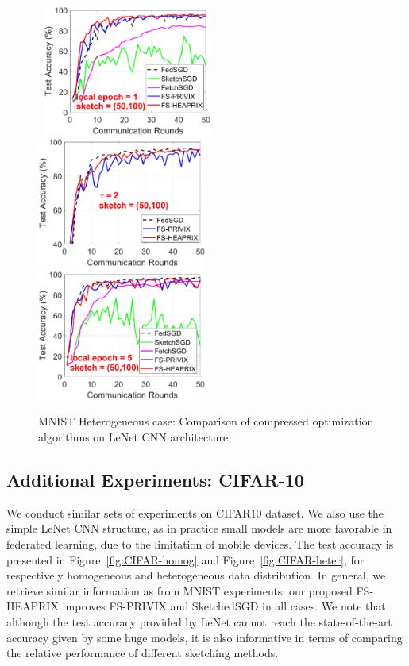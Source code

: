 \documentclass[11pt]{article}
\begin{document}
\begin{figure}[h]
\begin{center}
		\mbox{%
		\includegraphics[width=2.2in]{MNIST_figures/local1_sketch50_iid0_test_acc.eps}%
		\includegraphics[width=2.2in]{MNIST_figures/local2_sketch50_iid0_test_acc.eps} %
		\includegraphics[width=2.2in]{MNIST_figures/local5_sketch50_iid0_test_acc.eps}
		}
	\end{center}
	\caption{MNIST Heterogeneous case: Comparison of compressed optimization algorithms on LeNet CNN architecture.}
    \label{fig:MNIST-iid0-app}
\end{figure}


\newpage
\subsection{Additional Experiments: CIFAR-10}


We conduct similar sets of experiments on CIFAR10 dataset. We also use the simple LeNet CNN structure, as in practice small models are more favorable in federated learning, due to the limitation of mobile devices. The test accuracy is presented in Figure~\ref{fig:CIFAR-homog} and Figure~\ref{fig:CIFAR-heter}, for respectively homogeneous and heterogeneous data distribution. In general, we retrieve similar information as from MNIST experiments: our proposed FS-HEAPRIX improves FS-PRIVIX and SketchedSGD in all cases. We note that although the test accuracy provided by LeNet cannot reach the state-of-the-art accuracy given by some huge models, it is also informative in terms of comparing the relative performance of different sketching methods.
\end{document}
